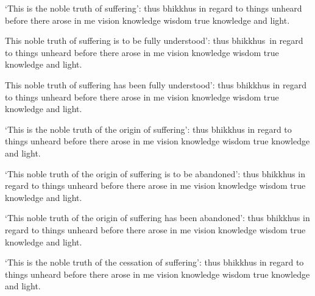 \medskip

\begin{english-hang}
  `This is the noble truth of suffering': thus bhikkhus in regard to things unheard before there arose in me vision knowledge wisdom true knowledge and light.
\end{english-hang}

\medskip

\begin{english-hang}
  This noble truth of suffering is to be fully understood': thus \mbox{bhikkhus}~in regard to things unheard before there arose in me vision knowledge wisdom true knowledge and light.
\end{english-hang}

\medskip

\begin{english-hang}
  This noble truth of suffering has been fully understood': thus bhikkhus in regard to things unheard before there arose in me vision knowledge wisdom true knowledge and light.
\end{english-hang}

\medskip

\begin{english-hang}
  `This is the noble truth of the origin of suffering': thus bhikkhus in regard to things unheard before there arose in me vision knowledge wisdom true knowledge and light.
\end{english-hang}

\medskip

\begin{english-hang}
  `This noble truth of the origin of suffering is to be abandoned': thus bhikkhus in regard to things unheard before there arose in me vision knowledge wisdom true knowledge and light.
\end{english-hang}

\medskip

\begin{english-hang}
  `This noble truth of the origin of suffering has been abandoned': thus bhikkhus in regard to things unheard before there arose in me vision knowledge wisdom true knowledge and light.
\end{english-hang}

\medskip

\begin{english-hang}
  `This is the noble truth of the cessation of suffering': thus bhikkhus in regard to things unheard before there arose in me vision knowledge wisdom true knowledge and light.
\end{english-hang}

